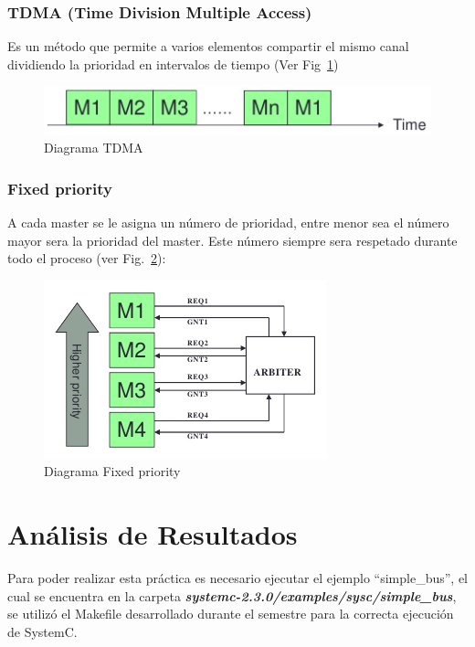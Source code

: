 \documentclass[twocolumn]{IEEEtran}
\begin{document}
\subsubsection{TDMA (Time Division Multiple Access)}
\noindent
Es un método que permite a varios elementos compartir el mismo canal dividiendo la prioridad en intervalos de tiempo (Ver Fig~\ref{fig8})
\begin{figure}
\centering
 \includegraphics[scale=0.5]{fig8.png}
  \caption{Diagrama TDMA}
 \label{fig8}
\end{figure}

\subsubsection{Fixed priority}
\noindent
A cada master se le asigna un número de prioridad, entre menor sea el número mayor sera la prioridad del master. Este número siempre sera respetado durante todo el proceso (ver Fig.~\ref{fig9}):
\begin{figure}
\centering
 \includegraphics[scale=0.5]{fig9.png}
  \caption{Diagrama Fixed priority}
 \label{fig9}
\end{figure}

\section{Análisis de Resultados}
\noindent
Para poder realizar esta práctica es necesario ejecutar el ejemplo ``simple\_bus'', el cual se encuentra en la carpeta \textbf{\textit{systemc-2.3.0/examples/sysc/simple\_bus}}, se utilizó el Makefile desarrollado durante el semestre para la correcta ejecución de SystemC.
\end{document}
